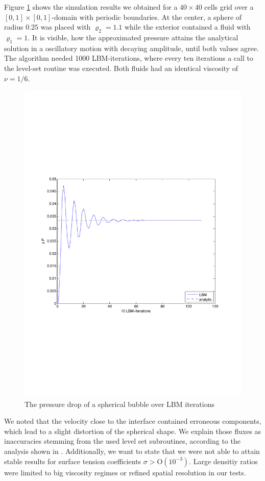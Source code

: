 \documentclass[final,leqno,onefignum,onetabnum]{siamltexmm}
\begin{document}
Figure \ref{laplace} shows the simulation results we obtained for a $40 \times 40$ cells grid over a $[0,1]\times[0,1]$-domain with periodic boundaries. At the center, a sphere of radius $0.25$ was placed with $\varrho_2 = 1.1$ while the exterior contained a fluid with $\varrho_1 = 1$. It is visible, how the approximated pressure attains the analytical solution in a oscillatory motion with decaying amplitude, until both values agree. The algorithm needed 1000 LBM-iterations, where every ten iterations a call to the level-set routine was executed. Both fluids had an identical viscosity of $\nu = 1/6$.
\begin{figure}[t!]
	\flushright
	\hfill\includegraphics[trim = 0mm 7.75cm 0mm 8.06cm, clip, width=.8\textwidth, natwidth=595,natheight=842]{laplace.pdf}\hspace*{\fill}
	\caption{The pressure drop of a spherical bubble over LBM iterations}
	\label{laplace}
\end{figure}
We noted that the velocity close to the interface contained erroneous components, which lead to a slight distortion of the spherical shape. We explain those fluxes as inaccuracies stemming from the used level set subroutines, according to the analysis shown in \cite{Thoemmes2}.
Additionally, we want to state that we were not able to attain stable results for surface tension coefficients $\sigma > \mathrm{O(10^{-3})}$. Large densitiy ratios were limited to big viscosity regimes or refined spatial resolution in our tests.
\end{document}
